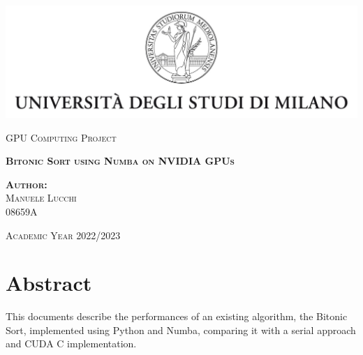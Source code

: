 \documentclass[a4paper, 12pt, oneside]{article}
\begin{document}
\begin{titlepage} %

  \begin{center}
    \includegraphics{images/logo.jpg}\par
    \vspace{1cm}
    {\scshape\large GPU Computing Project\par}
    \vspace{4cm}
    {\scshape\large\bfseries Bitonic Sort using Numba on NVIDIA GPUs\par}
    \vspace{4cm}
  \end{center}

  \begin{center}
    \scshape\normalsize\textbf{Author:}\\Manuele Lucchi\\08659A \par
  \end{center}

  \vfill

  {\begin{center}
      \scshape\large Academic Year 2022/2023
    \end{center}}

\end{titlepage}

\section{Abstract}
This documents describe the performances of an existing algorithm, the Bitonic Sort, implemented using Python and Numba, comparing it with a serial approach and CUDA C implementation.

\tableofcontents
\end{document}
